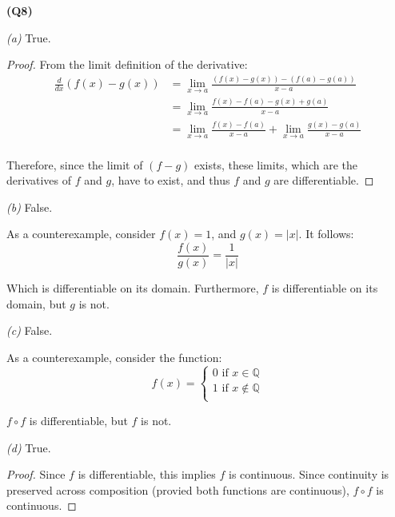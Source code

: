 \documentclass[12pt, a4paper]{article}
\newcommand{\Q}{\mathbb{Q}}
\newcommand{\ddx}{\frac{d}{dx}}
\newcommand{\displim}[1]{\displaystyle{\lim_{#1}}}
\begin{document}
\textbf{(Q8)}

\textit{(a)} True.

\begin{proof}
    From the limit definition of the derivative:
    \begin{align*}
        \ddx \left(f(x) - g(x)\right) & = 
        \displim{x \to a} \frac{\left(f(x) - g(x)\right) - \left(f(a) - g(a)\right)}{x - a}\\
        & = \displim{x \to a} \frac{f(x) - f(a) - g(x) + g(a)}{x - a}\\
        & = \displim{x \to a} \frac{f(x) - f(a)}{x - a} + 
        \displim{x \to a} \frac{g(x) - g(a)}{x - a}\\
    \end{align*}

    Therefore, since the limit of $(f - g)$ exists, these limits, which are the derivatives
    of $f$ and $g$, have to exist, and thus $f$ and $g$ are differentiable.
\end{proof}

\textit{(b)} False.

As a counterexample, consider $f(x) = 1$, and $g(x) = |x|$. It follows:
\[
    \frac{f(x)}{g(x)} = \frac{1}{|x|}
\]

Which is differentiable on its domain. Furthermore, $f$ is differentiable on its domain, but $g$ is not.

\textit{(c)} False.

As a counterexample, consider the function:
\[
    f(x) = \begin{cases}
        0 \text{ if } x \in \Q\\
        1 \text{ if } x \notin \Q\\
    \end{cases}
\]

$f \circ f$ is differentiable, but $f$ is not.

\textit{(d)} True.

\begin{proof}
    Since $f$ is differentiable, this implies $f$ is continuous. Since continuity is
    preserved across composition (provied both functions are continuous), 
    $f \circ f$ is continuous.
\end{proof}
\end{document}
